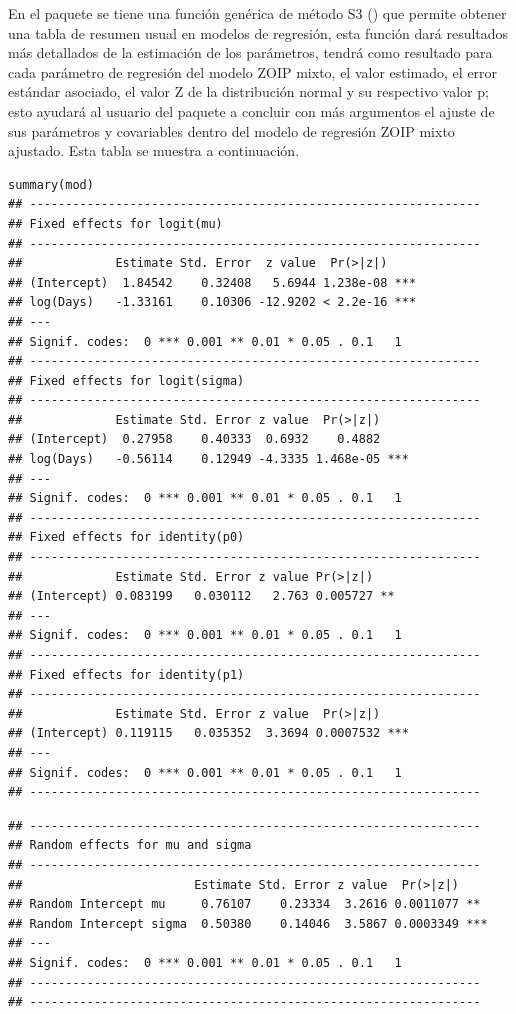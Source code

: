 En el paquete  se tiene una funci\'{o}n gen\'{e}rica de m\'{e}todo S3 () que permite obtener una tabla de resumen usual en modelos de regresi\'{o}n, esta funci\'{o}n dar\'{a} resultados m\'{a}s detallados de la estimaci\'{o}n de los par\'{a}metros, tendr\'{a} como resultado para cada par\'{a}metro de regresi\'{o}n del modelo ZOIP mixto, el valor estimado, el error est\'{a}ndar asociado, el valor Z de la distribuci\'{o}n normal y su respectivo valor p; esto ayudar\'{a} al usuario del paquete  a concluir con m\'{a}s argumentos el ajuste de sus par\'{a}metros y covariables dentro del modelo de regresi\'{o}n ZOIP mixto ajustado. Esta tabla se muestra a continuaci\'{o}n.

\begin{verbatim}
summary(mod)
## ---------------------------------------------------------------
## Fixed effects for logit(mu) 
## ---------------------------------------------------------------
##             Estimate Std. Error  z value  Pr(>|z|)    
## (Intercept)  1.84542    0.32408   5.6944 1.238e-08 ***
## log(Days)   -1.33161    0.10306 -12.9202 < 2.2e-16 ***
## ---
## Signif. codes:  0 *** 0.001 ** 0.01 * 0.05 . 0.1   1
## ---------------------------------------------------------------
## Fixed effects for logit(sigma) 
## ---------------------------------------------------------------
##             Estimate Std. Error z value  Pr(>|z|)    
## (Intercept)  0.27958    0.40333  0.6932    0.4882    
## log(Days)   -0.56114    0.12949 -4.3335 1.468e-05 ***
## ---
## Signif. codes:  0 *** 0.001 ** 0.01 * 0.05 . 0.1   1
## ---------------------------------------------------------------
## Fixed effects for identity(p0) 
## ---------------------------------------------------------------
##             Estimate Std. Error z value Pr(>|z|)   
## (Intercept) 0.083199   0.030112   2.763 0.005727 **
## ---
## Signif. codes:  0 *** 0.001 ** 0.01 * 0.05 . 0.1   1
## ---------------------------------------------------------------
## Fixed effects for identity(p1) 
## ---------------------------------------------------------------
##             Estimate Std. Error z value  Pr(>|z|)    
## (Intercept) 0.119115   0.035352  3.3694 0.0007532 ***
## ---
## Signif. codes:  0 *** 0.001 ** 0.01 * 0.05 . 0.1   1
## ---------------------------------------------------------------
\end{verbatim}
\begin{verbatim}
## ---------------------------------------------------------------
## Random effects for mu and sigma 
## ---------------------------------------------------------------
##                        Estimate Std. Error z value  Pr(>|z|)    
## Random Intercept mu     0.76107    0.23334  3.2616 0.0011077 ** 
## Random Intercept sigma  0.50380    0.14046  3.5867 0.0003349 ***
## ---
## Signif. codes:  0 *** 0.001 ** 0.01 * 0.05 . 0.1   1
## ---------------------------------------------------------------
## ---------------------------------------------------------------
\end{verbatim}

